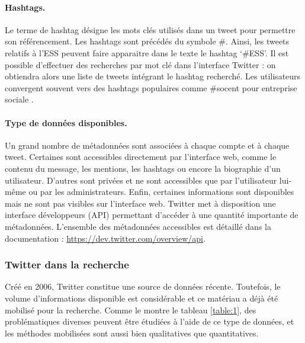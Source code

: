         \paragraph{Hashtags.}
        Le terme de hashtag désigne les mots clés utilisés dans un tweet pour permettre son référencement. Les hashtags sont précédés du symbole \#. Ainsi, les tweets relatifs à l’ESS peuvent faire apparaitre dans le texte le hashtag ‘\#ESS’. Il est possible d’effectuer des recherches par mot clé dans l’interface Twitter : on obtiendra alors une liste de tweets intégrant le hashtag recherché. Les utilisateurs convergent souvent vers des hashtags populaires comme  \og \#socent  \fg{} pour  \og entreprise sociale  \fg{}.

        \paragraph{Type de données disponibles.}
        Un grand nombre de métadonnées sont associées à chaque compte et à chaque tweet. Certaines sont accessibles directement par l’interface web, comme le contenu du message, les mentions, les hashtags ou encore la biographie d’un utilisateur. D’autres sont privées et ne sont accessibles que par l’utilisateur lui-même ou par les administrateurs. Enfin, certaines informations sont disponibles mais ne sont pas visibles sur l’interface web. Twitter met à disposition une interface développeurs (API) permettant d’accéder à une quantité importante de métadonnées. L’ensemble des métadonnées accessibles est détaillé dans la documentation : \url{https://dev.twitter.com/overview/api}.


    \subsubsection{Twitter dans la recherche}

        Créé en 2006, Twitter constitue une source de données récente. Toutefois, le volume d’informations disponible est considérable et ce matériau a déjà été mobilisé pour la recherche. Comme le montre le tableau \ref{table:1}, des problématiques diverses peuvent être étudiées à l’aide de ce type de données, et les méthodes mobilisées sont aussi bien qualitatives que quantitatives.

